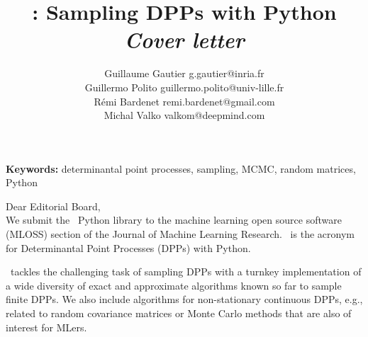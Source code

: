 \documentclass[twoside,11pt]{article}
\begin{document}
\title{\DPPy: Sampling DPPs with Python\\[1pt]
\textit{\normalsize Cover letter}}

\author{\name Guillaume Gautier
            \email g.gautier@inria.fr\\
        \name Guillermo Polito
            \email guillermo.polito@univ-lille.fr\\
        \name R\'emi Bardenet
            \email remi.bardenet@gmail.com\\
        \name Michal Valko
            \email valkom@deepmind.com
      }

\editor{}

\maketitle




\vspace{-4em}

\textbf{Keywords:}
    determinantal point processes,
    sampling,
    MCMC,
    random matrices,
    Python

\vspace{1em}

\setcounter{footnote}{3}

Dear Editorial Board,\\

We submit the \DPPy\ Python library to the machine learning open source software (MLOSS) section of the Journal of Machine Learning Research.
\DPPy\ is the acronym for Determinantal Point Processes (DPPs) with Python.

\DPPy\ tackles the challenging task of sampling DPPs with a turnkey implementation of a wide diversity of exact and approximate algorithms known so far to sample finite DPPs.
We also include algorithms for non-stationary continuous DPPs, e.g., related to random covariance matrices or Monte Carlo methods that are also of interest for MLers.
\end{document}
